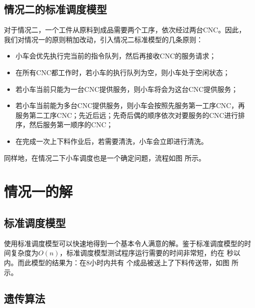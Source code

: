 \documentclass{cumcmthesis}
\begin{document}
	\subsection{情况二的标准调度模型}
	对于情况二，一个工件从原料到成品需要两个工序，依次经过两台CNC。因此，我们对情况一的原则稍加改动，引入情况二标准模型的几条原则：
	\begin{itemize}
		\item 小车会优先执行完当前的指令队列，然后再接收CNC的服务请求；
		\item 在所有CNC都工作时，若小车的执行队列为空，则小车处于空闲状态；
		\item 若小车当前只能为一台CNC提供服务，则小车将会为这台CNC提供服务；
		\item 若小车当前能为多台CNC提供服务，则小车会按照先服务第一工序CNC，再服务第二工序CNC；先近后远；先奇后偶的顺序依次对要服务的CNC进行排序，然后服务第一顺序的CNC；
		\item 在完成一次上下料作业后，若需要清洗，小车会立即进行清洗。
	\end{itemize}
	同样地，在情况二下小车调度也是一个确定问题，流程如图 所示。

	\section{情况一的解}
	\subsection{标准调度模型}
	使用标准调度模型可以快速地得到一个基本令人满意的解。鉴于标准调度模型的时间复杂度为\(O(n)\)，标准调度模型测试程序运行需要的时间非常短，约在 秒以内。而此模型的结果为：在8小时内共有 个成品被送上了下料传送带，如图 所示。
	
	\subsection{遗传算法}
\end{document}
